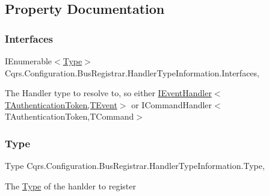 \subsection{Property Documentation}
\mbox{\label{classCqrs_1_1Configuration_1_1BusRegistrar_1_1HandlerTypeInformation_ac8a718951409cb2441c6184ab8257387_ac8a718951409cb2441c6184ab8257387}} 
\subsubsection{\texorpdfstring{Interfaces}{Interfaces}}
{\footnotesize\ttfamily I\+Enumerable$<$\hyperlink{classCqrs_1_1Configuration_1_1BusRegistrar_1_1HandlerTypeInformation_a7b8982debc0f0c30197eeddafc9d558d_a7b8982debc0f0c30197eeddafc9d558d}{Type}$>$ Cqrs.\+Configuration.\+Bus\+Registrar.\+Handler\+Type\+Information.\+Interfaces\hspace{0.3cm}{\ttfamily [get]}, {\ttfamily [set]}}



The Handler type to resolve to, so either \hyperlink{interfaceCqrs_1_1Events_1_1IEventHandler}{I\+Event\+Handler$<$\+T\+Authentication\+Token,\+T\+Event$>$} or I\+Command\+Handler$<$\+T\+Authentication\+Token,\+T\+Command$>$ 

\mbox{\label{classCqrs_1_1Configuration_1_1BusRegistrar_1_1HandlerTypeInformation_a7b8982debc0f0c30197eeddafc9d558d_a7b8982debc0f0c30197eeddafc9d558d}} 
\subsubsection{\texorpdfstring{Type}{Type}}
{\footnotesize\ttfamily Type Cqrs.\+Configuration.\+Bus\+Registrar.\+Handler\+Type\+Information.\+Type\hspace{0.3cm}{\ttfamily [get]}, {\ttfamily [set]}}



The \hyperlink{classCqrs_1_1Configuration_1_1BusRegistrar_1_1HandlerTypeInformation_a7b8982debc0f0c30197eeddafc9d558d_a7b8982debc0f0c30197eeddafc9d558d}{Type} of the hanlder to register 

